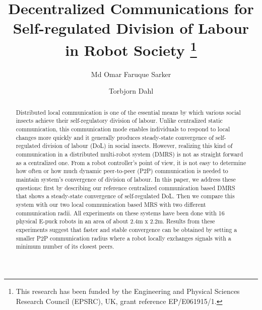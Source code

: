 \documentclass{llncs}
\begin{document}
\title{Decentralized Communications for Self-regulated Division of Labour in Robot Society
\thanks{This research has been funded by the Engineering and Physical Sciences Research Council (EPSRC), UK, grant reference EP/E061915/1.}
}
\author{Md Omar Faruque Sarker \and
	Torbjorn Dahl %
}
\maketitle
\begin{abstract}
Distributed local communication is one of the essential means by which various social insects achieve their self-regulatory division of labour. Unlike centralized static communication, this communication mode enables individuals to respond to local changes more quickly and it generally produces steady-state convergence of self-regulated division of labour (DoL) in social insects. However, realizing this kind of communication in a distributed multi-robot system (DMRS) is not as straight forward as a centralized one. From a robot controller's point of view, it is not easy to determine how often or how much dynamic peer-to-peer (P2P) communication  is needed to maintain system's convergence of division of labour. In this paper, we address these questions: first by describing our reference centralized communication based DMRS that shows a steady-state convergence of self-regulated DoL. Then we compare this system with our two local communication based MRS with two different communication radii. All experiments on these systems  have been done with 16 physical E-puck robots in an area of about 2.4m x 2.2m. Results from these experiments suggest that faster and stable convergence can be obtained by setting a smaller P2P communication radius where a robot locally exchanges signals with a minimum number of its closest peers.
\end{abstract}
\addtolength{\parskip}{-3.5mm}
\end{document}
